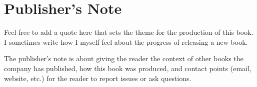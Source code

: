

\chapter{Publisher's Note}\label{foreword:cha}

\begin{myquotation}
Feel free to add a quote here that sets the theme for the production of this book. I sometimes write how I myself feel about the progress of releasing a new book.\end{myquotation}

The publisher's note is about giving the reader the context of other books the company has published, how this book was produced, and contact points (email, website, etc.) for the reader to report issues or ask questions.

\hfil{}\hfil
